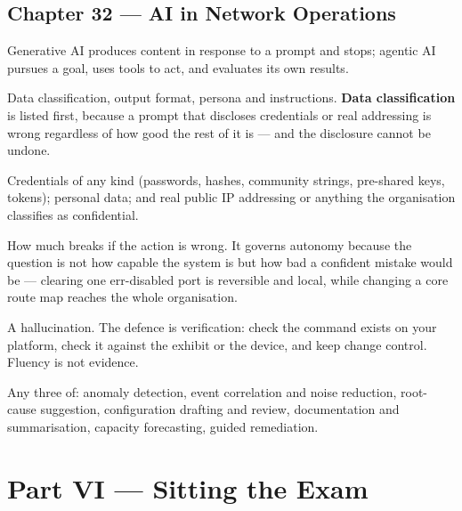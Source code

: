 \subsection*{Chapter 32 --- AI in Network Operations}
\begin{tightnum}
  \item Generative AI produces content in response to a prompt and stops; agentic
        AI pursues a goal, uses tools to act, and evaluates its own results.
  \item Data classification, output format, persona and instructions.
        \textbf{Data classification} is listed first, because a prompt that
        discloses credentials or real addressing is wrong regardless of how good
        the rest of it is --- and the disclosure cannot be undone.
  \item Credentials of any kind (passwords, hashes, community strings, pre-shared
        keys, tokens); personal data; and real public IP addressing or anything
        the organisation classifies as confidential.
  \item How much breaks if the action is wrong. It governs autonomy because the
        question is not how capable the system is but how bad a confident mistake
        would be --- clearing one err-disabled port is reversible and local, while
        changing a core route map reaches the whole organisation.
  \item A hallucination. The defence is verification: check the command exists on
        your platform, check it against the exhibit or the device, and keep change
        control. Fluency is not evidence.
  \item Any three of: anomaly detection, event correlation and noise reduction,
        root-cause suggestion, configuration drafting and review, documentation
        and summarisation, capacity forecasting, guided remediation.
\end{tightnum}

\section*{Part VI --- Sitting the Exam}

